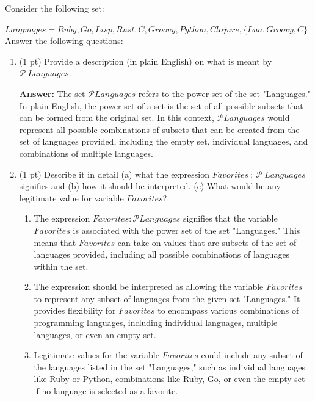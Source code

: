 \documentclass[12pt]{article}
\begin{document}
\begin{spacing}{1.5}
	Consider the following set:
				
	$Languages=Ruby, Go, Lisp, Rust, C, Groovy, Python, Clojure, \{Lua, Groovy, C\}$\\
				
	Answer the following questions:
				
	\begin{enumerate}
		\item (1 pt) Provide a description (in plain English) on what is meant by $\mathcal{P} \: Languages$.
		      		      		      		      
		      \textbf{Answer:} The set $\mathcal{P} Languages$ refers to the power set of the set "Languages." In plain English, the power set of a set is the set of all possible subsets that can be formed from the original set. In this context, $\mathcal{P} Languages$ would represent all possible combinations of subsets that can be created from the set of languages provided, including the empty set, individual languages, and combinations of multiple languages.\\
		      		      		      		      
		\item (1 pt) Describe it in detail (a) what the expression $Favorites\: : \: \mathcal{P} \: Languages$ signifies and (b) how it should be interpreted. (c) What would be any legitimate value for variable $Favorites$?
		      		      		      		      
		      \begin{enumerate}
		      	\item The expression $Favorites : \mathcal{P} Languages$ signifies that the variable $Favorites$ is associated with the power set of the set "Languages." This means that $Favorites$ can take on values that are subsets of the set of languages provided, including all possible combinations of languages within the set. 
		      	      		      	      		      	      		      	                      
		      	\item The expression should be interpreted as allowing the variable $Favorites$ to represent any subset of languages from the given set "Languages." It provides flexibility for $Favorites$ to encompass various combinations of programming languages, including individual languages, multiple languages, or even an empty set. 
		      	      		      	      		      	      		      	                      
		      	\item Legitimate values for the variable $Favorites$ could include any subset of the languages listed in the set "Languages," such as individual languages like Ruby or Python, combinations like {Ruby, Go}, or even the empty set if no language is selected as a favorite.
		      \end{enumerate}
		      		      		      		      

\end{enumerate}
\end{spacing}
\end{document}
